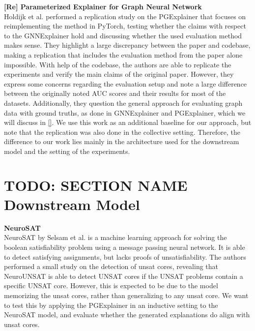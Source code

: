 \textbf{[Re] Parameterized Explainer for Graph Neural Network} \\
Holdijk et al. \cite{holdijk2021re} performed a replication study on the PGExplainer that focuses on reimplementing the method in PyTorch, testing whether the claims with respect to the GNNExplainer hold and discussing whether the used evaluation method makes sense. They highlight a large discrepancy between the paper and codebase, making a replication that includes the evaluation method from the paper alone impossible. With help of the codebase, the authors are able to replicate the experiments and verify the main claims of the original paper. However, they express some concerns regarding the evaluation setup and note a large difference between the originally noted AUC scores and their results for most of the datasets. Additionally, they question the general approach for evaluating graph data with ground truths, as done in GNNExplainer and PGExplainer, which we will discuss in \ref{}. We use this work as an additional baseline for our approach, but note that the replication was also done in the collective setting. Therefore, the difference to our work lies mainly in the architecture used for the downstream model and the setting of the experiments.


\section{TODO: SECTION NAME Downstream Model}
\label{sec:Downstream_Models}

\textbf{NeuroSAT} \\
NeuroSAT by Selsam et al. \cite{selsam2018learning} is a machine learning approach for solving the boolean satisfiability problem using a message passing neural network. It is able to detect satisfying assignments, but lacks proofs of unsatisfiability. The authors performed a small study on the detection of unsat cores, revealing that NeuroUNSAT is able to detect UNSAT cores if the UNSAT problems contain a specific UNSAT core. However, this is expected to be due to the model memorizing the unsat cores, rather than generalizing to any unsat core. We want to test this by applying the PGExplainer in an inductive setting to the NeuroSAT model, and evaluate whether the generated explanations do align with unsat cores.